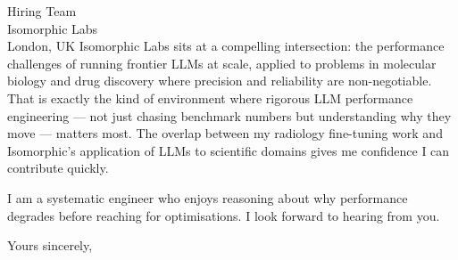 \documentclass[11pt,a4paper]{letter}
\begin{document}
\begin{letter}{Hiring Team \\ Isomorphic Labs \\ London, UK}
Isomorphic Labs sits at a compelling intersection: the performance challenges of running frontier LLMs at scale, applied to problems in molecular biology and drug discovery where precision and reliability are non-negotiable. That is exactly the kind of environment where rigorous LLM performance engineering — not just chasing benchmark numbers but understanding why they move — matters most. The overlap between my radiology fine-tuning work and Isomorphic's application of LLMs to scientific domains gives me confidence I can contribute quickly.

I am a systematic engineer who enjoys reasoning about why performance degrades before reaching for optimisations. I look forward to hearing from you.

\closing{Yours sincerely,}

\end{letter}
\end{document}
